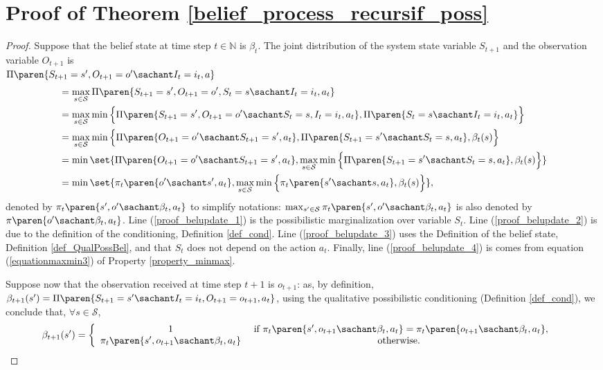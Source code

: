 \section{Proof of Theorem \ref{belief_process_recursif_poss}}
\begin{proof}
Suppose that the belief state at time step $t \in \mathbb{N}$
is $\beta_t$.
The joint distribution of the system state variable $S_{t+1}$
and the observation variable $O_{t+1}$ is
\\
$\Pi \paren{ S_{t+1} = s', O_{t+1} = o' \sachant I_{t} = i_{t}, a }$
\begin{align}
\label{proof_belupdate_1} &= \max_{s \in \mathcal{S}} \Pi \paren{ S_{t+1} = s', O_{t+1}= o', S_{t} = s \sachant I_{t} = i_{t}, a_t }\\
\label{proof_belupdate_2} &= \max_{s \in \mathcal{S}} \min \Big\{ \Pi \paren{ S_{t+1} = s', O_{t+1}= o' \sachant S_{t} = s, I_{t} = i_{t}, a_t }, \Pi \paren{ S_{t} = s \sachant I_{t} = i_{t}, a_t } \Big\}\\
\label{proof_belupdate_3} & = \max_{s \in \mathcal{S}} \min \Big\{ \Pi \paren{O_{t+1}= o' \sachant S_{t+1} = s', a_t}, \Pi \paren{ S_{t+1} = s' \sachant S_{t} = s, a_t }, \beta_t(s) \Big\}\\
\label{proof_belupdate_4} & = \min \set{ \Pi \paren{O_{t+1}= o' \sachant S_{t+1} = s', a_t},  \max_{s \in \mathcal{S}} \min \Big\{ \Pi \paren{ S_{t+1} = s' \sachant S_{t} = s, a_t }, \beta_t(s) \Big\} }\\
\nonumber & = \min \set{ \pi_{t} \paren{o' \sachant s', a_t},  \max_{s \in \mathcal{S}} \min \Big\{ \pi_t \paren{ s' \sachant s, a_t }, \beta_t(s) \Big\} },
\end{align}
denoted by $\pi_t \paren{ s', o' \sachant \beta_t, a_t}$ to simplify notations:
$\max_{s' \in \mathcal{S}} \pi_t \paren{ s', o' \sachant \beta_t, a_t}$ is also denoted by $\pi \paren{ o' \sachant \beta_t, a_t}$.
Line (\ref{proof_belupdate_1}) is the possibilistic marginalization over variable $S_t$. 
Line (\ref{proof_belupdate_2}) is due to the definition of the conditioning, Definition \ref{def_cond}. 
Line (\ref{proof_belupdate_3}) uses the Definition of the belief state, Definition \ref{def_QualPossBel},
and that $S_t$ does not depend on the action $a_t$.
Finally, line (\ref{proof_belupdate_4}) is comes from equation (\ref{equationmaxmin3}) of Property \ref{property_minmax}.

Suppose now that the observation received at time step $t+1$ is $o_{t+1}$:  
as, by definition, $\beta_{t+1}(s') = \Pi \paren{ S_{t+1} = s' \sachant I_{t} = i_{t}, O_{t+1} = o_{t+1}, a_t }$,
using the qualitative possibilistic conditioning (Definition \ref{def_cond}),
we conclude that, $\forall s \in \mathcal{S}$,
\begin{align*}
\beta_{t+1}(s') &= \left \{ \begin{array}{ccc}
1 & \mbox{ if } \pi_t \paren{ s', o_{t+1} \sachant \beta_t, a_t}= \pi_t \paren{ o_{t+1} \sachant \beta_t,a_t }, \\
\pi_t \paren{ s', o_{t+1} \sachant \beta_t, a_t} & \mbox{ otherwise. } 
\end{array} \right. 
\end{align*}
\end{proof}
